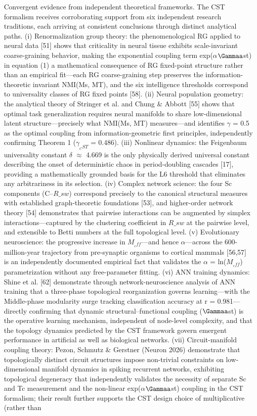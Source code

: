 \documentclass[a4paper,12pt]{article}
\begin{document}
Convergent evidence from independent theoretical frameworks. The CST formalism receives corroborating support from six independent research traditions, each arriving at consistent conclusions through distinct analytical paths. (i) Renormalization group theory: the phenomenological RG applied to neural data [51] shows that criticality in neural tissue exhibits scale-invariant coarse-graining behavior, making the exponential coupling term exp($\alpha$\cdot$\Gammaa$st) in equation (1) a mathematical consequence of RG fixed-point structure rather than an empirical fit---each RG coarse-graining step preserves the information-theoretic invariant NMI(Ms, MT), and the six intelligence thresholds correspond to universality classes of RG fixed points [58]. (ii) Neural population geometry: the analytical theory of Stringer et al. and Chung \& Abbott [55] shows that optimal task generalization requires neural manifolds to share low-dimensional latent structure---precisely what NMI(Ms, MT) measures---and identifies $\gamma$ = 0.5 as the optimal coupling from information-geometric first principles, independently confirming Theorem 1 ($\gamma_{_CST}$ = 0.486). (iii) Nonlinear dynamics: the Feigenbaum universality constant $\delta$ $\approx$ 4.669 is the only physically derived universal constant describing the onset of deterministic chaos in period-doubling cascades [17], providing a mathematically grounded basis for the L6 threshold that eliminates any arbitrariness in its selection. (iv) Complex network science: the four Sc components (C--$R\_{sw}$) correspond precisely to the canonical structural measures with established graph-theoretic foundations [53], and higher-order network theory [54] demonstrates that pairwise interactions can be augmented by simplex interactions---captured by the clustering coefficient in $R\_{sw}$ at the pairwise level, and extensible to Betti numbers at the full topological level. (v) Evolutionary neuroscience: the progressive increase in $M_{_eff}$---and hence $\alpha$---across the 600-million-year trajectory from pre-synaptic organisms to cortical mammals [56,57] is an independently documented empirical fact that validates the $\alpha$ = ln($M_{_eff}$) parametrization without any free-parameter fitting. (vi) ANN training dynamics: Shine et al. [62] demonstrate through network-neuroscience analysis of ANN training that a three-phase topological reorganization governs learning---with the Middle-phase modularity surge tracking classification accuracy at r = 0.981---directly confirming that dynamic structural--functional coupling ($\Gammaa$st) is the operative learning mechanism, independent of node-level complexity, and that the topology dynamics predicted by the CST framework govern emergent performance in artificial as well as biological networks. (vii) Circuit-manifold coupling theory: Pezon, Schmutz & Gerstner (Neuron 2026) demonstrate that topologically distinct circuit structures impose non-trivial constraints on low-dimensional manifold dynamics in spiking recurrent networks, exhibiting topological degeneracy that independently validates the necessity of separate Sc and Tc measurement and the non-linear exp($\alpha$\cdot$\Gammaa$st) coupling in the CST formalism; their result further supports the CST design choice of multiplicative (rather than 
\end{document}
